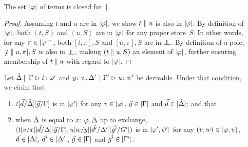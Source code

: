\begin{proposition}
 \label{type-conc}
 The set $|{\varphi}|$ of terms is closed for $\parallel$.
\end{proposition}
\begin{proof}
 Assuming $t$ and $u$ are in $|{\varphi}|$, we show $t\parallel u$ is also in
 $|{\varphi}|$.
 By definition of $|{\varphi}|$, both $(t,S)$ and $(u,S)$ are in $|{\varphi}|$
 for any proper store~$S$.
 In other words, for any $\pi\in|{\varphi}|^-$,
 both $[t,\pi],S$ and $[u,\pi],S$ are in $\bbot$.
 By definition of a pole,
 $[t\parallel u,\pi],S$ is also in $\bbot$,
 making $(t\parallel u, S)$ an element of $|{\varphi}|$, further ensuring
 membership of $t\parallel u$ with regard to $|{\varphi}|$.
\end{proof}
\begin{proposition}[Adequacy]
 Let ${\hat{\Delta} }\mid\,{\Gamma }\vartriangleright{ {t} \colon{\varphi'} }$ and
     ${{y} \colon{\psi},\Delta'}\mid\,{\Gamma'}\vartriangleright{ {u} \colon{\psi'} }$ be
 derivable.  Under that condition, we claim that
 \begin{enumerate}[label=(\arabic{*}), ref=\textit{(\arabic{*})}]
  \item \label{c:first}
	$t[\vec d/\hat{\Delta}][\vec g/\Gamma]$ is in $|{\varphi'}|$ for any
	$v\in|{\varphi}|$, $\vec g\in|{\Gamma}|$ and $\vec d\in|{\hat{\Delta}}|$; and that
  \item \label{c:second} when $\hat {\Delta}$ is equal to  ${x} \colon{\varphi}, \Delta$ up
	to exchange,
	$(t[v/x][\vec d/\Delta][\vec g/\Gamma],
	u[w/y][\vec{d'}/\Delta'][\vec{g'}/G'])$ is in $|{\varphi',\psi'}|$
	for any $(v,w)    \in |{\varphi,\psi}|$,
	        $\vec d   \in |{\Delta}|$,
	        $\vec{d'} \in |{\Delta'}|$,
	        $\vec{g}  \in |{\Gamma}|$ and
	        $\vec{g'} \in |{\Gamma'}|$.
 \end{enumerate}
\end{proposition}
